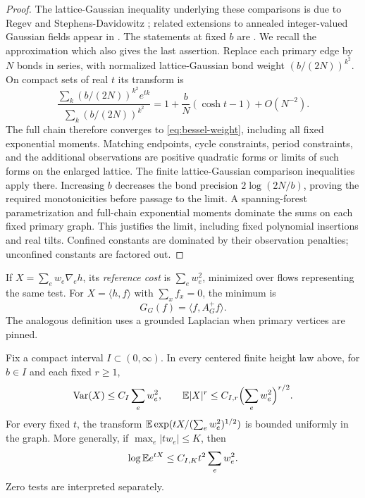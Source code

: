 \begin{proof}
The lattice-Gaussian inequality underlying these comparisons is due
to Regev and Stephens-Davidowitz \cite{RSD}; related extensions to
annealed integer-valued Gaussian fields appear in
\cite[Appendix~D]{AHPS}.  The statements at fixed $b$ are \cite[Lemma~2.2]{X}.  We recall the
approximation which also gives the last assertion.  Replace each primary
edge by $N$ bonds in series, with normalized lattice-Gaussian bond weight
$(b/(2N))^{k^2}$.  On compact sets of real $t$ its transform is
\[
 \frac{\sum_k(b/(2N))^{k^2}e^{tk}}
      {\sum_k(b/(2N))^{k^2}}
 =1+\frac bN(\cosh t-1)+O(N^{-2}).
\]
The full chain therefore converges to \eqref{eq:bessel-weight}, including
all fixed exponential moments.  Matching endpoints, cycle constraints,
period constraints, and the additional observations are positive
quadratic forms or limits of such forms on the enlarged lattice.  The
finite lattice-Gaussian comparison inequalities apply there.  Increasing
$b$ decreases the bond precision $2\log(2N/b)$, proving the required
monotonicities before passage to the limit.  A spanning-forest
parametrization and full-chain exponential moments dominate the sums on
each fixed primary graph.  This justifies the limit, including fixed
polynomial insertions and real tilts.  Confined constants are dominated
by their observation penalties; unconfined constants are factored out.
\end{proof}

If $X=\sum_e w_e\nabla_eh$, its \emph{reference cost} is
$\sum_e w_e^2$, minimized over flows representing the same test.  For
$X=\langle h,f\rangle$ with $\sum_xf_x=0$, the minimum is
\begin{equation}\label{eq:reference-cost}
                 G_G(f)=\langle f,A_G^+f\rangle.
\end{equation}
The analogous definition uses a grounded Laplacian when primary vertices
are pinned.

\begin{lemma}\label{lem:reference-cost}
Fix a compact interval $I\subset(0,\infty)$.  In every centered finite
height law above, for $b\in I$ and each fixed $r\ge1$,
\begin{equation}\label{eq:reference-moments}
 \operatorname{Var}(X)\le C_I\sum_e w_e^2,\qquad
 \mathbb E|X|^r\le C_{I,r}\Bigl(\sum_e w_e^2\Bigr)^{r/2}.
\end{equation}
For every fixed $t$, the transform
$\mathbb E\exp(tX/(\sum_e w_e^2)^{1/2})$ is bounded uniformly in the graph.
More generally, if $\max_e|tw_e|\le K$, then
\begin{equation}\label{eq:bounded-flow-mgf}
                \log\mathbb E e^{tX}\le C_{I,K}t^2\sum_e w_e^2.
\end{equation}
Zero tests are interpreted separately.
\end{lemma}

